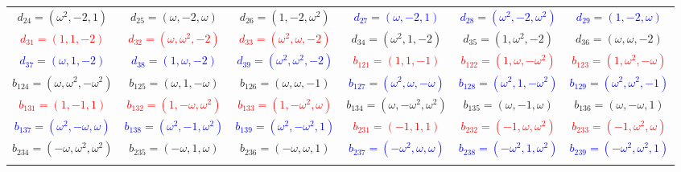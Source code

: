 \documentclass[%
  reprint,
  superscriptaddress,
  showkeys,
  amsmath,amssymb,
  aps,pra,
  longbibliography,
  floatfix,
  x11names
]{revtex4-2}
\DeclareRobustCommand{\chgbox}[1]{{\setlength{\fboxsep}{0.8pt}\fcolorbox{blue}{white}{#1}}}
\begin{document}
\begin{table}[htbp!]
\begin{ruledtabular}
\begin{tabular}{*{6}{c}}
\textcolor{green!40!black}{$d_{24}=(\omega^2,-2,1)$} & \textcolor{green!40!black}{$d_{25}=(\omega,-2,\omega)$} & \textcolor{green!40!black}{$d_{26}=(1,-2,\omega^2)$} & \textcolor{blue}{$d_{27}=(\omega,-2,1)$} & \textcolor{blue}{$d_{28}=(\omega^2,-2,\omega^2)$} & \textcolor{blue}{$d_{29}=(1,-2,\omega)$} \\
\textcolor{red}{$d_{31}=(1,1,-2)$} & \textcolor{red}{$d_{32}=(\omega,\omega^2,-2)$} & \textcolor{red}{$d_{33}=(\omega^2,\omega,-2)$} & \textcolor{green!40!black}{$d_{34}=(\omega^2,1,-2)$} & \textcolor{green!40!black}{$d_{35}=(1,\omega^2,-2)$} & \textcolor{green!40!black}{$d_{36}=(\omega,\omega,-2)$} \\
\textcolor{blue}{$d_{37}=(\omega,1,-2)$} & \textcolor{blue}{$d_{38}=(1,\omega,-2)$} & \textcolor{blue}{$d_{39}=(\omega^2,\omega^2,-2)$} & \textcolor{red}{$b_{121}=(1,1,-1)$} & \textcolor{red}{$b_{122}=(1,\omega,-\omega^2)$} & \textcolor{red}{$b_{123}=(1,\omega^2,-\omega)$} \\
\textcolor{green!40!black}{$b_{124}=(\omega,\omega^2,-\omega^2)$} & \textcolor{green!40!black}{$b_{125}=(\omega,1,-\omega)$} & \textcolor{green!40!black}{$b_{126}=(\omega,\omega,-1)$} & \textcolor{blue}{$b_{127}=(\omega^2,\omega,-\omega)$} & \textcolor{blue}{$b_{128}=(\omega^2,1,-\omega^2)$} & \textcolor{blue}{$b_{129}=(\omega^2,\omega^2,-1)$} \\
\textcolor{red}{$b_{131}=(1,-1,1)$} & \textcolor{red}{$b_{132}=(1,-\omega,\omega^2)$} & \textcolor{red}{$b_{133}=(1,-\omega^2,\omega)$} & \textcolor{green!40!black}{$b_{134}=(\omega,-\omega^2,\omega^2)$} & \textcolor{green!40!black}{$b_{135}=(\omega,-1,\omega)$} & \textcolor{green!40!black}{$b_{136}=(\omega,-\omega,1)$} \\
\textcolor{blue}{$b_{137}=(\omega^2,-\omega,\omega)$} & \textcolor{blue}{$b_{138}=(\omega^2,-1,\omega^2)$} & \textcolor{blue}{$b_{139}=(\omega^2,-\omega^2,1)$} & \textcolor{red}{$b_{231}=(-1,1,1)$} & \textcolor{red}{$b_{232}=(-1,\omega,\omega^2)$} & \textcolor{red}{$b_{233}=(-1,\omega^2,\omega)$} \\
\textcolor{green!40!black}{$b_{234}=(-\omega,\omega^2,\omega^2)$} & \textcolor{green!40!black}{$b_{235}=(-\omega,1,\omega)$} & \textcolor{green!40!black}{$b_{236}=(-\omega,\omega,1)$} & \textcolor{blue}{$b_{237}=(-\omega^2,\omega,\omega)$} & \textcolor{blue}{$b_{238}=(-\omega^2,1,\omega^2)$} & \textcolor{blue}{$b_{239}=(-\omega^2,\omega^2,1)$} \\
\chgbox{\textcolor{red}{$e_{11}=(2,1,1)$}} & \chgbox{\textcolor{red}{$e_{12}=(2,\omega,\omega^2)$}} & \chgbox{\textcolor{red}{$e_{13}=(2,\omega^2,\omega)$}} & \chgbox{\textcolor{green!40!black}{$e_{14}=(2\omega^2,1,1)$}} & \chgbox{\textcolor{green!40!black}{$e_{15}=(2\omega^2,\omega,\omega^2)$}} & \chgbox{\textcolor{green!40!black}{$e_{16}=(2\omega^2,\omega^2,\omega)$}} \\

\end{tabular}
\end{ruledtabular}
\end{table}
\end{document}
